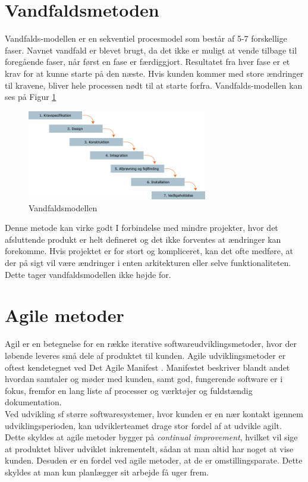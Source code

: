 \section{Vandfaldsmetoden}\label{sec:vandfald}
Vandfalds-modellen er en sekventiel procesmodel som består af 5-7 forskellige faser. 
Navnet vandfald er blevet brugt, da det ikke er muligt at vende tilbage til foregående faser, 
når først en fase er færdiggjort. Resultatet fra hver fase er et krav for at kunne starte på den næste. 
Hvis kunden kommer med store ændringer til kravene, bliver hele processen nødt til at starte forfra.  
Vandfalds-modellen kan ses på Figur \ref{fig:waterfallmodel} \\

\begin{figure}[h]
    \centering
    \includegraphics[width=0.7\textwidth]{figures/waterfall.png}
    \caption{Vandfaldsmodellen \cite{WaterfallModel}}
    \label{fig:waterfallmodel}
\end{figure}

Denne metode kan virke godt I forbindelse med mindre projekter, hvor det afsluttende produkt er 
helt defineret og det ikke forventes at ændringer kan forekomme. Hvis projektet er for stort og kompliceret,
kan det ofte medføre, at der på sigt vil være ændringer i enten arkitekturen eller selve funktionaliteten.
Dette tager vandfaldsmodellen ikke højde for.

\section{Agile metoder}\label{sec:agilemetoder}
Agil er en betegnelse for en række iterative softwareudviklingsmetoder, hvor der løbende leveres små dele af 
produktet til kunden. Agile udviklingsmetoder er oftest kendetegnet ved Det Agile Manifest \cite{AgileManifesto}.
Manifestet beskriver blandt andet hvordan samtaler og møder med kunden, samt god, fungerende software er i fokus, 
fremfor en lang liste af processer og værktøjer og fuldstændig dokumentation. \\

Ved udvikling sf større softwaresystemer, hvor kunden er en nær kontakt igennem udviklingsperioden, kan udviklerteamet
drage stor fordel af at udvikle agilt. Dette skyldes at agile metoder bygger på \textit{continual improvement},
hvilket vil sige at produktet bliver udviklet inkrementelt, sådan at man altid har noget at vise kunden. Desuden er en fordel ved agile
metoder, at de er omstillingsparate. Dette skyldes at man kun planlægger sit arbejde få uger frem.